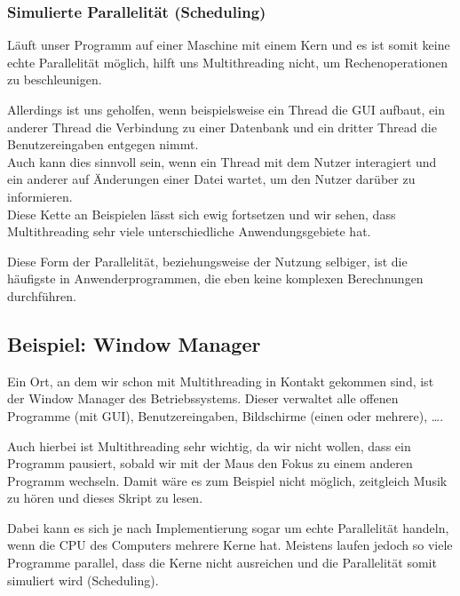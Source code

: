 	\subsubsection{Simulierte Parallelität (Scheduling)}
		Läuft unser Programm auf einer Maschine mit einem Kern und es ist somit keine echte Parallelität möglich, hilft uns Multithreading nicht, um Rechenoperationen zu beschleunigen.
		
		Allerdings ist uns geholfen, wenn beispielsweise ein Thread die GUI aufbaut, ein anderer Thread die Verbindung zu einer Datenbank und ein dritter Thread die Benutzereingaben entgegen nimmt. \\ Auch kann dies sinnvoll sein, wenn ein Thread mit dem Nutzer interagiert und ein anderer auf Änderungen einer Datei wartet, um den Nutzer darüber zu informieren. \\ Diese Kette an Beispielen lässt sich ewig fortsetzen und wir sehen, dass Multithreading sehr viele unterschiedliche Anwendungsgebiete hat.
		
		Diese Form der Parallelität, beziehungsweise der Nutzung selbiger, ist die häufigste in Anwenderprogrammen, die eben keine komplexen Berechnungen durchführen.

\subsection{Beispiel: Window Manager}
	Ein Ort, an dem wir schon mit Multithreading in Kontakt gekommen sind, ist der Window Manager des Betriebssystems. Dieser verwaltet alle offenen Programme (mit GUI), Benutzereingaben, Bildschirme (einen oder mehrere), \dots.
	
	Auch hierbei ist Multithreading sehr wichtig, da wir nicht wollen, dass ein Programm pausiert, sobald wir mit der Maus den Fokus zu einem anderen Programm wechseln. Damit wäre es zum Beispiel nicht möglich, zeitgleich Musik zu hören und dieses Skript zu lesen.
	
	Dabei kann es sich je nach Implementierung sogar um echte Parallelität handeln, wenn die CPU des Computers mehrere Kerne hat. Meistens laufen jedoch so viele Programme parallel, dass die Kerne nicht ausreichen und die Parallelität somit simuliert wird (Scheduling).
